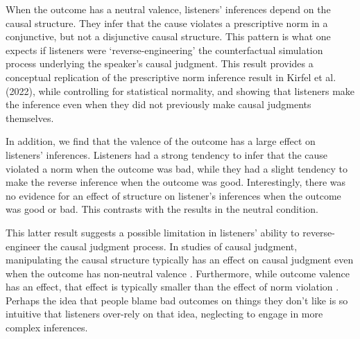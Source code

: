\documentclass[fleqn,reqno,10pt]{article}
\begin{document}
When the outcome has a neutral valence, listeners' inferences depend on the causal structure. They infer that the cause violates a prescriptive norm in a conjunctive, but not a disjunctive causal structure. This pattern is what one expects if listeners were `reverse-engineering' the counterfactual simulation process underlying the speaker's causal judgment. This result provides a conceptual replication of the prescriptive norm inference result in Kirfel et al. (2022), while controlling for statistical normality, and showing that listeners make the inference even when they did not previously make causal judgments themselves.

In addition, we find that the valence of the outcome has a large effect on listeners' inferences. Listeners had a strong tendency to infer that the cause violated a norm when the outcome was bad, while they had a slight tendency to make the reverse inference when the outcome was good. Interestingly, there was no evidence for an effect of structure on listener's inferences when the outcome was good or bad. This contrasts with the results in the neutral condition. 

This latter result suggests a possible limitation in listeners' ability to reverse-engineer the causal judgment process. In studies of causal judgment, manipulating the causal structure typically has an effect on causal judgment even when the outcome has non-neutral valence \citep{kominsky2015causal, icard2017normality}. Furthermore, while outcome valence has an effect, that effect is typically smaller than the effect of norm violation \citep{alicke2011causation, kominsky2015causal, icard2017normality}. Perhaps the idea that people blame bad outcomes on things they don't like is so intuitive that listeners over-rely on that idea, neglecting to engage in more complex inferences.

\printbibliography[heading=bibintoc]
\end{document}
